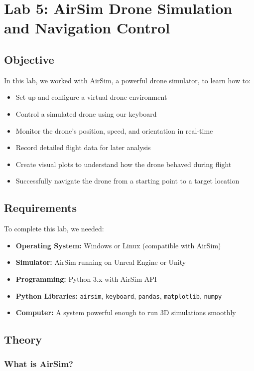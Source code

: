 \section{Lab 5: AirSim Drone Simulation and Navigation Control}

\subsection{Objective}
In this lab, we worked with AirSim, a powerful drone simulator, to learn how to:
\begin{itemize}
	\item Set up and configure a virtual drone environment
	\item Control a simulated drone using our keyboard
	\item Monitor the drone's position, speed, and orientation in real-time
	\item Record detailed flight data for later analysis
	\item Create visual plots to understand how the drone behaved during flight
	\item Successfully navigate the drone from a starting point to a target location
\end{itemize}

\subsection{Requirements}
To complete this lab, we needed:
\begin{itemize}
	\item \textbf{Operating System:} Windows or Linux (compatible with AirSim)
	\item \textbf{Simulator:} AirSim running on Unreal Engine or Unity
	\item \textbf{Programming:} Python 3.x with AirSim API
	\item \textbf{Python Libraries:} \texttt{airsim}, \texttt{keyboard}, \texttt{pandas}, \texttt{matplotlib}, \texttt{numpy}
	\item \textbf{Computer:} A system powerful enough to run 3D simulations smoothly
\end{itemize}

\subsection{Theory}

\subsubsection{What is AirSim?}

